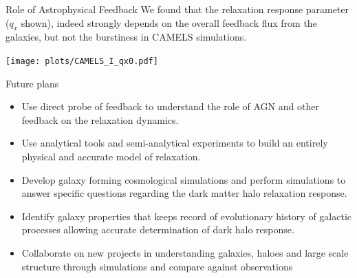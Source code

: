 \documentclass{beamer}
\begin{document}
\begin{frame}{Role of Astrophysical Feedback}
    We found that the relaxation response parameter ($q_x$ shown), indeed strongly depends on the overall feedback flux from the galaxies, but not the burstiness in CAMELS simulations.
    \begin{center}
        \texttt{[image: plots/CAMELS\_I\_qx0.pdf]}
    \end{center}
\end{frame}


\begin{frame}{Future plans}
    \begin{itemize}
        \item Use direct probe of feedback to understand the role of AGN and other feedback on the relaxation dynamics.
        \item Use analytical tools and semi-analytical experiments to build an entirely physical and accurate model of relaxation.
        \item Develop galaxy forming cosmological simulations and perform simulations to answer specific questions regarding the dark matter halo relaxation response.
        \item Identify galaxy properties that keeps record of evolutionary history of galactic processes allowing accurate determination of dark halo response.
        \item Collaborate on new projects in understanding galaxies, haloes and large scale structure through simulations and compare against observations
    \end{itemize}
\end{frame}
\end{document}
